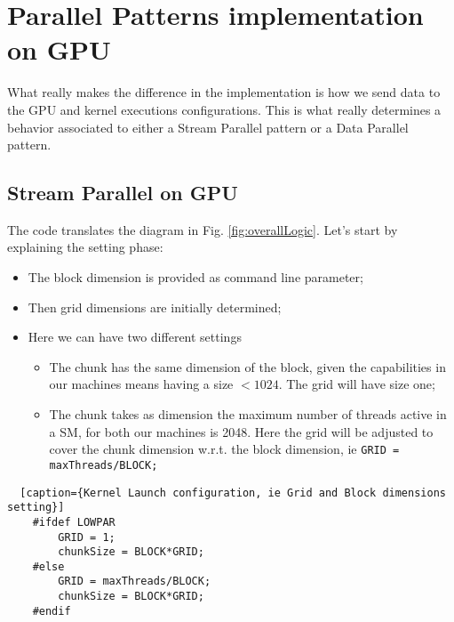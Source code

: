 \section{Parallel Patterns implementation on GPU}
What really makes the difference in the implementation is how we send data to the GPU and kernel executions configurations.
This is what really determines a behavior associated to either a Stream Parallel pattern or a Data Parallel pattern.


\subsection{Stream Parallel on GPU}
	The code translates the diagram in Fig. \ref{fig:overallLogic}.
	Let's start by explaining the setting phase:
	\begin{itemize}
		\item The block dimension is provided as command line parameter;
		\item Then grid dimensions are initially determined;
		\item Here we can have two different settings
		\begin{itemize}
			\item The chunk has the same dimension of the block, given the capabilities in our machines means having a size \(< 1024\). The grid will have size one;
			\item The chunk takes as dimension the maximum number of threads active in a SM, for both our machines is 2048. Here the grid will be adjusted to cover the chunk dimension w.r.t. the block dimension, ie \texttt{GRID = maxThreads/BLOCK;}
		\end{itemize}
	
	\end{itemize}
	\begin{lstlisting}	[caption={Kernel Launch configuration, ie Grid and Block dimensions setting}]	
	#ifdef LOWPAR
		GRID = 1;
		chunkSize = BLOCK*GRID;		
	#else
		GRID = maxThreads/BLOCK;  
		chunkSize = BLOCK*GRID;		
	#endif		
	\end{lstlisting}
	
